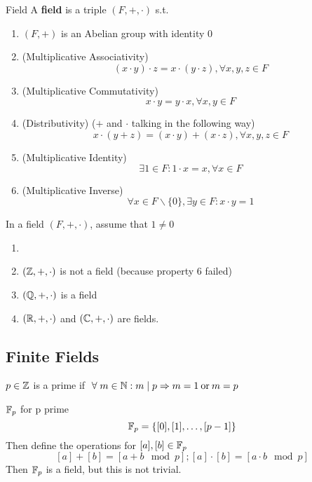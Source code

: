 \begin{definition} {Field}
    A \textbf{field} is a triple \((F, +, \cdot)\) s.t.
    \begin{enumerate}
        \item \((F, +)\) is an Abelian group with identity 0
        \item (Multiplicative Associativity) \[
                  (x \cdot y) \cdot z = x \cdot (y \cdot z), \forall x, y, z \in F
              \]
        \item (Multiplicative Commutativity) \[
                  x \cdot y = y \cdot x, \forall x, y \in F
              \]
        \item (Distributivity) (\(+\) and \(\cdot\) talking in the following way) \[
                  x \cdot (y + z) = (x \cdot y) + (x \cdot z), \forall x, y, z \in F
              \]
        \item (Multiplicative Identity) \[\exists 1 \in F: 1 \cdot x = x, \forall x \in F\]
        \item (Multiplicative Inverse) \[\forall x \in F\backslash\{0\}, \exists y \in F: x \cdot y = 1\]
    \end{enumerate}
\end{definition}
\begin{remark}
    In a field \((F, +, \cdot)\), assume that \(1\neq 0\)
\end{remark}
\begin{example}
    \begin{enumerate}
        \item[]
        \item \((\mathbb{Z}, +, \cdot)\) is not a field (because property 6 failed)
        \item  \((\mathbb{Q}, +, \cdot)\) is a field
        \item \((\mathbb{R}, +, \cdot)\) and \((\mathbb{C}, +, \cdot)\) are fields.
    \end{enumerate}
\end{example}

\subsection{Finite Fields}
\begin{recall}
    \(p\in \mathbb{Z}\) is a prime if \(\forall m\in \bbn: m \mid p \implies m = 1 \:\text{or}\:  m = p\)
\end{recall}
\begin{definition} {\(\mathbb{F}_p\) for p prime}
    \[
        \mathbb{F}_p = \{[0], [1], \dots, [p-1]\}
    \]
    Then define the operations for \([a], [b] \in \mathbb{F}_p\)
    \[
        [a] + [b] = [a + b \mod p]; [a] \cdot [b] = [a \cdot b \mod p]
    \]
    Then \(\mathbb{F}_p\) is a field, but this is not trivial.
\end{definition}

